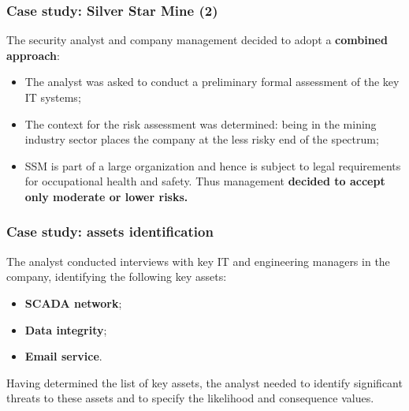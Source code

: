 \documentclass[xcolor ={table,usenames,dvipsnames}]{beamer}
\theoremstyle{definition}
\begin{document}
	\begin{frame}
		\frametitle{Case study: Silver Star Mine (2)}
		The security analyst and company management decided to adopt a \textbf{combined approach}:
		\begin{itemize}
			\item The analyst was asked to conduct a preliminary formal assessment of the key IT systems;
			\item The context for the risk assessment was determined: being in the mining industry sector places the company at the less risky end of the ­spectrum;
			\item SSM is part of a large organization and hence is subject to legal requirements for occupational health and safety. Thus management \textbf{decided to accept only moderate or lower risks.}
		\end{itemize}
	\end{frame}

	\begin{frame}
		\frametitle{Case study: assets identification}
		The analyst conducted interviews with key IT and engineering managers in the company, identifying the following key assets:
		\begin{itemize}
			\item \textbf{SCADA network};
			\item \textbf{Data integrity};
			\item \textbf{Email service}.
		\end{itemize}
		Having determined the list of key assets, the analyst needed to identify significant threats to these assets and to specify the likelihood and consequence values.
	\end{frame}
	
\end{document}
